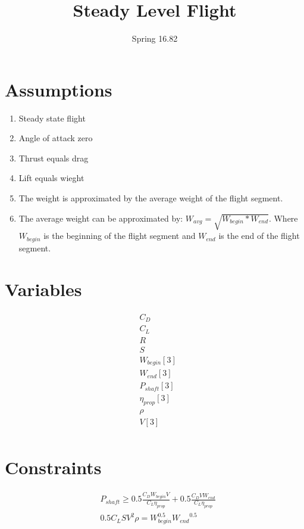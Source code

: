 \documentclass[10pt, a4paper]{article}
\begin{document}
\title{Steady Level Flight}
\author{Spring 16.82}
\maketitle

\section*{Assumptions} 

\begin{enumerate}

\item Steady state flight
\item Angle of attack zero
\item Thrust equals drag
\item Lift equals wieght
\item The weight is approximated by the average weight of the flight segment. 
\item The average weight can be approximated by: $W_{avg} = \sqrt{W_{begin}*W_{end}}$.  Where $W_{begin}$ is the beginning of the flight segment and $W_{end}$ is the end of the flight segment. 

\end{enumerate}

\section*{Variables}

\[\begin{array}{ll}
    & C_D \\
    & C_L\\
    & R \\
    & S \\
    & W_{begin}[3]\\
    & W_{end}[3]\\
    & P_{shaft}[3]\\
    & \eta_{prop}[3]\\
    & \rho \\
    & V[3] \\
\end{array} \]

\section*{Constraints}

\[ \begin{array}{ll}
    & P_{shaft} \geq 0.5\frac{C_D W_{begin} {V}}{C_L {\eta_{prop}}} + 0.5\frac{C_D {V} {W_{end}}}{C_L {\eta_{prop}}}\\
    & 0.5C_L S {V}^{2} {\rho} = W_{begin}^{0.5} {W_{end}}^{0.5} \\
\end{array} \]
\end{document}
